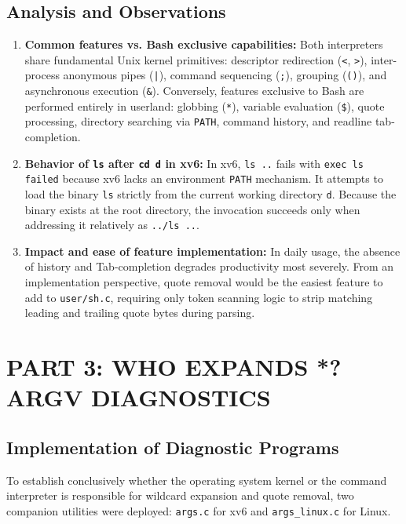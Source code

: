 \documentclass[12pt,a4paper]{report}
\numberwithin{equation}{chapter}
\numberwithin{figure}{chapter}
\numberwithin{table}{chapter}
\begin{document}
\section{Analysis and Observations}
\begin{enumerate}
    \item \textbf{Common features vs. Bash exclusive capabilities:} Both interpreters share fundamental Unix kernel primitives: descriptor redirection (\texttt{<}, \texttt{>}), inter-process anonymous pipes (\texttt{|}), command sequencing (\texttt{;}), grouping (\texttt{()}), and asynchronous execution (\texttt{\&}). Conversely, features exclusive to Bash are performed entirely in userland: globbing (\texttt{*}), variable evaluation (\texttt{\$}), quote processing, directory searching via \texttt{PATH}, command history, and readline tab-completion.
    \item \textbf{Behavior of \texttt{ls} after \texttt{cd d} in xv6:} In xv6, \texttt{ls ..} fails with \texttt{exec ls failed} because xv6 lacks an environment \texttt{PATH} mechanism. It attempts to load the binary \texttt{ls} strictly from the current working directory \texttt{d}. Because the binary exists at the root directory, the invocation succeeds only when addressing it relatively as \texttt{../ls ..}.
    \item \textbf{Impact and ease of feature implementation:} In daily usage, the absence of history and Tab-completion degrades productivity most severely. From an implementation perspective, quote removal would be the easiest feature to add to \texttt{user/sh.c}, requiring only token scanning logic to strip matching leading and trailing quote bytes during parsing.
\end{enumerate}

\chapter{PART 3: WHO EXPANDS *? ARGV DIAGNOSTICS}

\section{Implementation of Diagnostic Programs}
To establish conclusively whether the operating system kernel or the command interpreter is responsible for wildcard expansion and quote removal, two companion utilities were deployed: \texttt{args.c} for xv6 and \texttt{args\_linux.c} for Linux.
\end{document}
